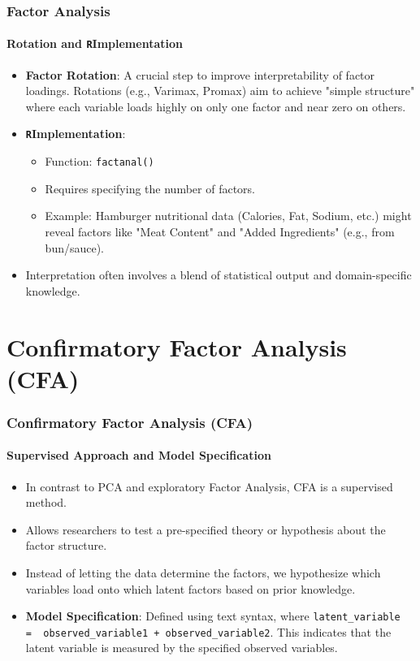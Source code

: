 \documentclass{beamer}
\newcommand{\R}{\texttt{R}}
\newcommand{\code}[1]{\texttt{#1}}
\begin{document}
\begin{frame}
    \frametitle{Factor Analysis}
    \framesubtitle{Rotation and \R Implementation}
    \begin{itemize}
        \item \textbf{Factor Rotation}: A crucial step to improve interpretability of factor loadings. Rotations (e.g., Varimax, Promax) aim to achieve "simple structure" where each variable loads highly on only one factor and near zero on others.
        \item \textbf{\R Implementation}:
            \begin{itemize}
                \item Function: \code{factanal()}
                \item Requires specifying the number of factors.
                \item Example: Hamburger nutritional data (Calories, Fat, Sodium, etc.) might reveal factors like "Meat Content" and "Added Ingredients" (e.g., from bun/sauce).
            \end{itemize}
        \item Interpretation often involves a blend of statistical output and domain-specific knowledge.
    \end{itemize}
\end{frame}

\section{Confirmatory Factor Analysis (CFA)}

\begin{frame}
    \frametitle{Confirmatory Factor Analysis (CFA)}
    \framesubtitle{Supervised Approach and Model Specification}
    \begin{itemize}
        \item In contrast to PCA and exploratory Factor Analysis, CFA is a \alert{supervised} method.
        \item Allows researchers to \alert{test a pre-specified theory} or hypothesis about the factor structure.
        \item Instead of letting the data determine the factors, we hypothesize which variables load onto which latent factors based on prior knowledge.
    \item \textbf{Model Specification}: Defined using text syntax, where \texttt{latent\_variable =~ observed\_variable1 + observed\_variable2}. This indicates that the latent variable is measured by the specified observed variables.
    \end{itemize}
\end{frame}
\end{document}
